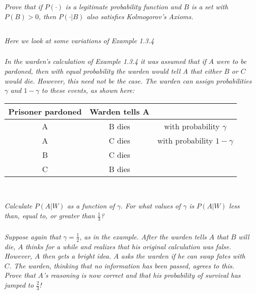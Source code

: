 \documentclass[12pt]{amsart}
\begin{document}
\setcounter{subsection}{34}
\subsection{} %
\textit{Prove that if \(P(\cdot)\) is a legitimate probability function and \(B\) is a set with \(P (B) > 0\),
	then \(P (\cdot|B)\) also satisfies Kolmogorov’s Axioms.}

\setcounter{subsection}{36}
\subsection{} %
\textit{Here we look at some variations of Example 1.3.4}
	\subsubsection{}
	\textit{ In the warden’s calculation of Example 1.3.4 it was assumed that if \(A\) were to be
		pardoned, then with equal probability the warden would tell A that either \(B\) or \(C\)
		would die. However, this need not be the case. The warden can assign probabilities
		\(\gamma\) and \(1 − \gamma\) to these events, as shown here:} \\
	\begin{center}
		\begin{tabular}{ccc}
			\toprule
			Prisoner pardoned & Warden tells A & \\
			\midrule
			A & B dies & with probability \(\gamma\) \\
			A & C dies & with probability \(1-\gamma\) \\
			B & C dies & \\
			C & B dies & \\
			\bottomrule
		\end{tabular} \\[1.5em]
	\end{center}
	\textit{Calculate \(P(A|W)\) as a function of \(\gamma\). For what values of \(\gamma\) is \(P(A|W)\) less than,
		equal to, or greater than \(\frac 1 3\)?}
	\subsubsection{}
	\textit{Suppose again that \(\gamma = \frac 1 2\), as in the example. After the warden tells \(A\) that \(B\)
		will die, \(A\) thinks for a while and realizes that his original calculation was false.
		However, \(A\) then gets a bright idea. \(A\) asks the warden if he can swap fates with \(C\).
		The warden, thinking that no information has been passed, agrees to this. Prove
		that \(A\)’s reasoning is now correct and that his probability of survival has jumped to \(\frac 2 3\)!} \\
	
\end{document}
